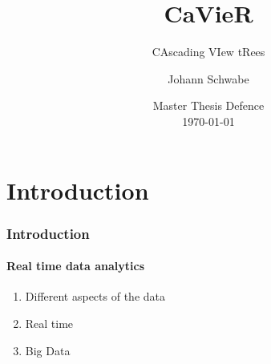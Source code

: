 \documentclass[
	11pt, %
]{beamer}
\title[CaVieR]{CaVieR} %
\subtitle{CAscading VIew tRees} %
\author[Johann Schwabe]{Johann Schwabe} %
\institute[UZH]{University of Zurich\\ \smallskip \textit{johann.schwabe@uzh.ch}} %
\date[\today]{Master Thesis Defence \\ \today} %
\begin{document}

\begin{frame}
	\titlepage %
\end{frame}






\section{Introduction}
\begin{frame}
	\frametitle{Introduction}
	\framesubtitle{Real time data analytics}
	\begin{enumerate}
		\item Different aspects of the data
		\item Real time
		\item Big Data
	\end{enumerate}
\end{frame}
\end{document}
